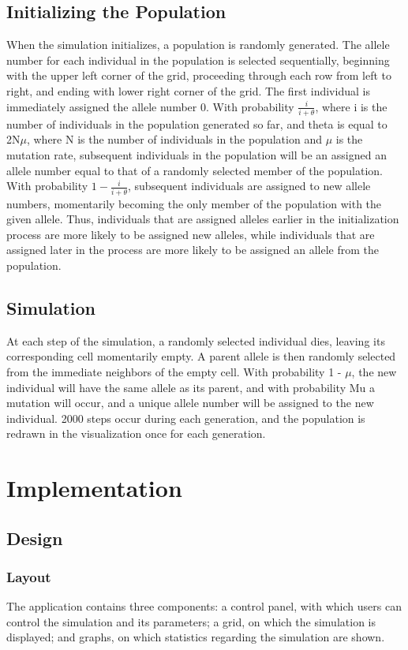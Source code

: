 \documentclass[12pt]{article}
\begin{document}
\begin{spacing}{1.5}
\subsection{Initializing the Population}
When the simulation initializes, a population is randomly generated. The allele number for each individual in the population is selected sequentially, beginning with the upper left corner of the grid, proceeding through each row from left to right, and ending with lower right corner of the grid. The first individual is immediately assigned the allele number 0. With probability $\displaystyle \frac {i}{i + \theta}$, where i is the number of individuals in the population generated so far, and theta is equal to 2N$\mu$, where N is the number of individuals in the population and $\mu$ is the mutation rate, subsequent individuals in the population will be an assigned an allele number equal to that of a randomly selected member of the population. With probability $\displaystyle 1 - \frac{i}{i + \theta}$, subsequent individuals are assigned to new allele numbers, momentarily becoming the only member of the population with the given allele. Thus, individuals that are assigned alleles earlier in the initialization process are more likely to be assigned new alleles, while individuals that are assigned later in the process are more likely to be assigned an allele from the population.
\subsection{Simulation}
At each step of the simulation, a randomly selected individual dies, leaving its corresponding cell momentarily empty. A parent allele is then randomly selected from the immediate neighbors of the empty cell. With probability 1 - $\mu$, the new individual will have the same allele as its parent, and with probability Mu a mutation will occur, and a unique allele number will be assigned to the new individual. 2000 steps occur during each generation, and the population is redrawn in the visualization once for each generation.

\section{Implementation}
\subsection{Design}
\subsubsection{Layout}
The application contains three components: a control panel, with which users can control the simulation and its parameters; a grid, on which the simulation is displayed; and graphs, on which statistics regarding the simulation are shown.

\end{spacing}
\end{document}
